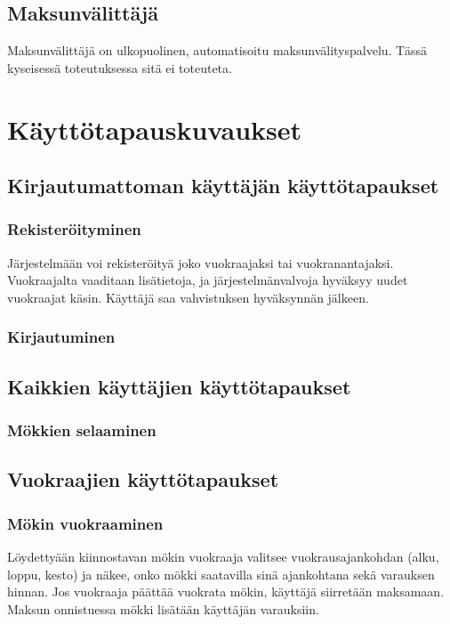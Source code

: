 \subsection*{Maksunvälittäjä}
Maksunvälittäjä on ulkopuolinen, automatisoitu maksunvälityspalvelu. Tässä kyseisessä toteutuksessa sitä ei toteuteta.

\section{Käyttötapauskuvaukset}

\subsection{Kirjautumattoman käyttäjän käyttötapaukset}
\subsubsection*{Rekisteröityminen}
Järjestelmään voi rekisteröityä joko vuokraajaksi tai vuokranantajaksi. Vuokraajalta vaaditaan lisätietoja, ja järjestelmänvalvoja hyväksyy uudet vuokraajat käsin. Käyttäjä saa vahvistuksen hyväksynnän jälkeen.
\subsubsection*{Kirjautuminen}

\subsection{Kaikkien käyttäjien käyttötapaukset}
\subsubsection*{Mökkien selaaminen}

\subsection{Vuokraajien käyttötapaukset}
\subsubsection*{Mökin vuokraaminen}
Löydettyään kiinnostavan mökin vuokraaja valitsee vuokrausajankohdan (alku, loppu, kesto) ja näkee, onko mökki saatavilla sinä ajankohtana sekä varauksen hinnan. Jos vuokraaja päättää vuokrata mökin, käyttäjä siirretään maksamaan. Maksun onnistuessa mökki lisätään käyttäjän varauksiin.

